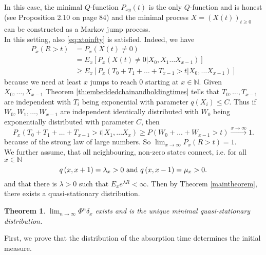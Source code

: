 \documentclass[12pt,a4paper]{scrartcl}
\newtheorem{theorem}{Theorem}[section]
\numberwithin{equation}{section}
\newcommand{\N}{\mathbb{N}} %
\begin{document}
In this case, the minimal $Q$-function $P_{xy}\left(t\right)$ is the only $Q$-function and is honest (see \cite{anderson} Proposition 2.10 on page 84) and the minimal process $X = \left(X\left(t\right)\right)_{t \geq 0}$ can be constructed as a Markov jump process. \\[2ex]
In this setting, also \eqref{eq:xtoinfty} is satisfied. Indeed, we have
\begin{align*}
P_x\left(R > t \right) &= P_x\left( X\left(t\right) \neq 0 \right) \\
&= E_x\left[ P_x\left(X\left(t\right) \neq 0 | X_0, X_1 \ldots X_{x-1} \right)  \right] \\
&\geq E_x\left[ P_x\left(T_0 + T_1 + \ldots + T_{x-1} > t | X_0, \ldots X_{x-1} \right) \right]
\end{align*}
because we need at least $x$ jumps to reach $0$ starting at $x \in \N.$
Given $X_0,\ldots,X_{x-1}$ Theorem \ref{th:embeddedchainandholdingtimes} tells that $T_0,\ldots,T_{x-1}$ are independent with $T_i$ being exponential with parameter $q\left(X_i\right) \leq C.$ Thus if $W_0,W_1,\ldots, W_{x-1}$ are independent identically distributed with $W_0$ being exponentially distributed with parameter $C$, then
$$ P_x\left(T_0 + T_1 + \ldots + T_{x-1} > t | X_1, \ldots X_x \right) \geq P\left(W_0 + \ldots + W_{x-1} > t \right) \overset{x \to \infty}{\to} 1. $$
because of the strong law of large numbers.
So $\lim_{x \to \infty} P_x\left( R > t\right) = 1.$ \\[2ex]



We further assume, that all neighbouring, non-zero states connect, i.e. for all $x \in \N$
\begin{equation} 
q\left(x,x+1\right) = \lambda_x > 0 \textnormal{ and } q\left(x,x-1\right) = \mu_x > 0.
\end{equation}
and that there is $\lambda > 0$ such that $E_x e^{\lambda R} < \infty.$ Then by Theorem \ref{maintheorem}, there exists a quasi-stationary distribution. 

\begin{theorem} \label{th:birthanddeathmaintheorem}
$\lim_{n \to \infty} \Phi^n \delta_x$ exists and is the unique minimal quasi-stationary distribution.
\end{theorem}  

First, we prove that the distribution of the absorption time determines the initial measure.
\end{document}
